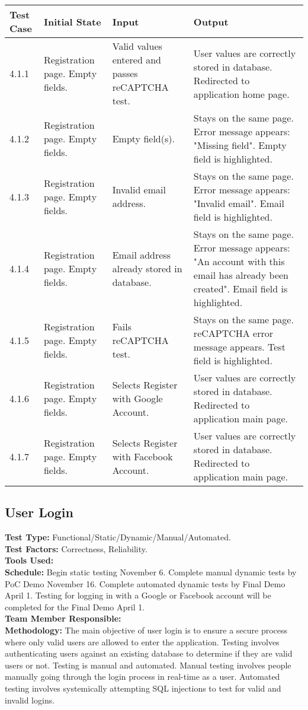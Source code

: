 \documentclass[12pt]{article}
\begin{document}
\begin{longtable}{|p{2cm}|p{3cm}|p{5cm}|p{5cm}|}
\hline
\textbf{Test Case}  & \textbf{Initial State} & \textbf{Input} & \textbf{Output} \\ \hline
4.1.1 & Registration page. Empty fields. & Valid values entered and passes reCAPTCHA test. & User values are correctly stored in database. Redirected to application home page.  \\ 
\hline
4.1.2 & Registration page. Empty fields. & Empty field(s). & Stays on the same page. Error message appears: "Missing field". Empty field is highlighted. \\
\hline
4.1.3 & Registration page. Empty fields. & Invalid email address. & Stays on the same page. Error message appears: "Invalid email". Email field is highlighted. \\
\hline
4.1.4 & Registration page. Empty fields. & Email address already stored in database. & Stays on the same page. Error message appears: "An account with this email has already been created". Email field is highlighted. \\
\hline
4.1.5 & Registration page. Empty fields. & Fails reCAPTCHA test. & Stays on the same page. reCAPTCHA error message appears. Test field is highlighted. \\
\hline
4.1.6 & Registration page. Empty fields. & Selects Register with Google Account. & User values are correctly stored in database. Redirected to application main page. \\
\hline
4.1.7 & Registration page. Empty fields. & Selects Register with Facebook Account. & User values are correctly stored in database. Redirected to application main page. \\
\hline
\end{longtable}



\subsection{User Login}
\textbf{Test Type:} Functional/Static/Dynamic/Manual/Automated. \\
\textbf{Test Factors:} Correctness, Reliability. \\
\textbf{Tools Used:} \\
\textbf{Schedule:} Begin static testing November 6. Complete manual dynamic tests by PoC Demo November 16. Complete automated dynamic tests by Final Demo April 1. Testing for logging in with a Google or Facebook account will be completed for the Final Demo April 1. \\
\textbf{Team Member Responsible:} \\
\textbf{Methodology:} The main objective of user login is to ensure a secure process where only valid users are allowed to enter the application. Testing involves authenticating users against an existing database to determine if they are valid users or not. Testing is manual and automated. Manual testing involves people manually going through the login process in real-time as a user. Automated testing involves systemically attempting SQL injections to test for valid and invalid logins.
\end{document}
